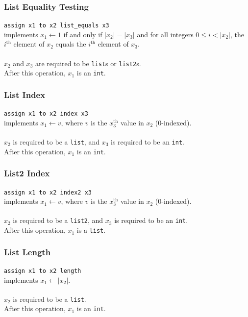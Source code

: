 \subsubsection{List Equality Testing}

\texttt{assign x1 to x2 list\_equals x3} \\
implements $x_1 \leftarrow 1$ if and only if $|x_2| = |x_3|$ and for all integers $0 \le i < |x_2|$, the $i^{\textrm{th}}$ element of $x_2$ equals the $i^{\textrm{th}}$ element of $x_3$. \\ \\
$x_2$ and $x_3$ are required to be \texttt{list}s or \texttt{list2}s. \\
After this operation, $x_1$ is an \texttt{int}. 

\subsubsection{List Index}

\texttt{assign x1 to x2 index x3} \\
implements $x_1 \leftarrow v$, where $v$ is the $x_3^{\textrm{th}}$ value in $x_2$ (0-indexed). \\ \\
$x_2$ is required to be a \texttt{list}, and $x_3$ is required to be an \texttt{int}. \\
After this operation, $x_1$ is an \texttt{int}.

\subsubsection{List2 Index}

\texttt{assign x1 to x2 index2 x3} \\
implements $x_1 \leftarrow v$, where $v$ is the $x_3^{\textrm{th}}$ value in $x_2$ (0-indexed). \\ \\
$x_2$ is required to be a \texttt{list2}, and $x_3$ is required to be an \texttt{int}. \\
After this operation, $x_1$ is a \texttt{list}.

\subsubsection{List Length}

\texttt{assign x1 to x2 length} \\
implements $x_1 \leftarrow |x_2|$. \\ \\ 
$x_2$ is required to be a \texttt{list}. \\
After this operation, $x_1$ is an \texttt{int}.

